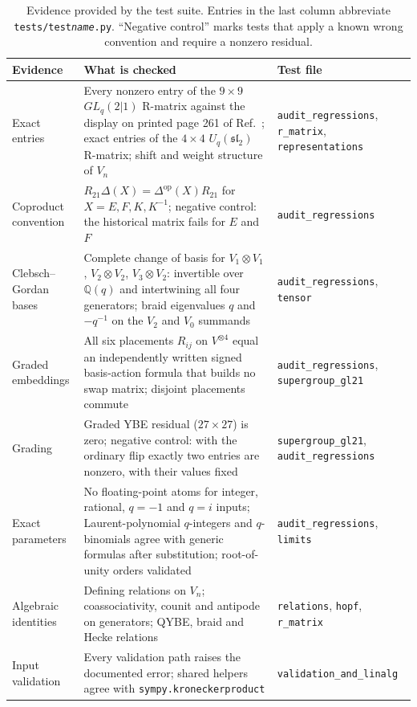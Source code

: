 \documentclass{SciPost}
\newcommand{\code}[1]{\texttt{\begingroup\def\_{\textunderscore\allowbreak}#1\endgroup}}
\newcommand{\Uq}{U_q(\mathfrak{sl}_2)}
\newcommand{\GL}{GL_q(2|1)}
\begin{document}
\begin{table}[t]
\centering
\caption{Evidence provided by the test suite. Entries in the last column abbreviate \code{tests/test\_\textit{name}.py}. ``Negative control'' marks tests that apply a known wrong convention and require a nonzero residual.}
\label{tab:qc}
\small
\begin{tabularx}{\textwidth}{@{}>{\raggedright\arraybackslash}p{}>{\raggedright\arraybackslash}X>{\raggedright\arraybackslash}p{}@{}}
\toprule
Evidence & What is checked & Test file \\
\midrule
Exact entries & Every nonzero entry of the $9\times9$ $\GL$ R-matrix against the display on printed page 261 of Ref.~\cite{celik2021}; exact entries of the $4\times4$ $\Uq$ R-matrix; shift and weight structure of $V_n$ & \texttt{audit\_regressions}, \texttt{r\_matrix}, \texttt{representations} \\
Coproduct convention & $R_{21}\Delta(X)=\Delta^{\mathrm{op}}(X)R_{21}$ for $X=E,F,K,K^{-1}$; negative control: the historical matrix fails for $E$ and $F$ & \texttt{audit\_regressions} \\
Clebsch--Gordan bases & Complete change of basis for $V_1\otimes V_1$, $V_2\otimes V_2$, $V_3\otimes V_2$: invertible over $\mathbb{Q}(q)$ and intertwining all four generators; braid eigenvalues $q$ and $-q^{-1}$ on the $V_2$ and $V_0$ summands & \texttt{audit\_regressions}, \texttt{tensor} \\
Graded embeddings & All six placements $R_{ij}$ on $V^{\otimes4}$ equal an independently written signed basis-action formula that builds no swap matrix; disjoint placements commute & \texttt{audit\_regressions}, \texttt{supergroup\_gl21} \\
Grading & Graded YBE residual ($27\times27$) is zero; negative control: with the ordinary flip exactly two entries are nonzero, with their values fixed & \texttt{supergroup\_gl21}, \texttt{audit\_regressions} \\
Exact parameters & No floating-point atoms for integer, rational, $q=-1$ and $q=i$ inputs; Laurent-polynomial $q$-integers and $q$-binomials agree with generic formulas after substitution; root-of-unity orders validated & \texttt{audit\_regressions}, \texttt{limits} \\
Algebraic identities & Defining relations on $V_n$; coassociativity, counit and antipode on generators; QYBE, braid and Hecke relations & \texttt{relations}, \texttt{hopf}, \texttt{r\_matrix} \\
Input validation & Every validation path raises the documented error; shared helpers agree with \code{sympy.kronecker\_product} & \texttt{validation\_and\_\allowbreak linalg} \\
\bottomrule
\end{tabularx}
\end{table}
\end{document}
